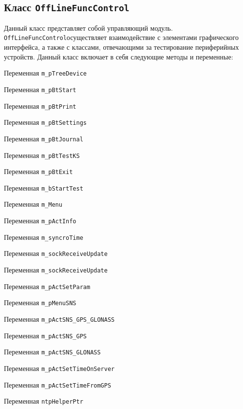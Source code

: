 \subsection{Класс \texttt{OffLineFuncControl}}
Данный класс представляет собой управляющий модуль. \texttt{OffLineFuncControl}осуществляет взаимодействие с элементами графического
интерфейса, а также с классами, отвечающими за тестирование периферийных устройств.
Данный класс включает в себя следующие методы и переменные:
\begin{enum}
	\item Переменная \texttt{m\_pTreeDevice}
	\item Переменная \texttt{m\_pBtStart}
	\item Переменная \texttt{m\_pBtPrint}
	\item Переменная \texttt{m\_pBtSettings}
	\item Переменная \texttt{m\_pBtJournal}
	\item Переменная \texttt{m\_pBtTestKS}
	\item Переменная \texttt{m\_pBtExit}

	\item Переменная \texttt{m\_bStartTest}
	\item Переменная \texttt{m\_Menu}
	\item Переменная \texttt{m\_pActInfo}

	\item Переменная \texttt{m\_syncroTime}

	\item Переменная \texttt{m\_sockReceiveUpdate}

	\item Переменная \texttt{m\_sockReceiveUpdate}

	\item Переменная \texttt{m\_pActSetParam}
	\item Переменная \texttt{m\_pMenuSNS}
	\item Переменная \texttt{m\_pActSNS\_GPS\_GLONASS}
	\item Переменная \texttt{m\_pActSNS\_GPS}
	\item Переменная \texttt{m\_pActSNS\_GLONASS}

	\item Переменная \texttt{m\_pActSetTimeOnServer}
	\item Переменная \texttt{m\_pActSetTimeFromGPS}

	\item Переменная \texttt{ntpHelperPtr}


\end{enum}
